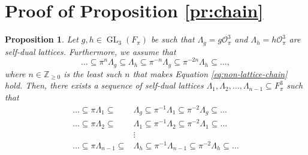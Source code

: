 \documentclass{eptcs}
\newtheorem{proposition}[theorem]{Proposition}
\theoremstyle{remark}
\theoremstyle{definition}
\DeclareMathOperator{\GL}{GL}
\begin{document}
\section{Proof of Proposition \ref{pr:chain}}
\label{proofofprop5.22}
\begin{proposition}
\label{pr:chain_repeat}
    Let $g,h \in \GL_{3}(F_{\pi})$ be such that $\Lambda_{g} = g \mathcal{O}_{\pi}^{3}$ and $\Lambda_{h} =h \mathcal{O}_{\pi}^{3}$ are self-dual lattices. Furthermore, we assume that 
    \begin{equation}
	\dots \subseteq \pi^{n}\Lambda_{g} \subseteq \Lambda_{h} \subseteq \pi^{-n}\Lambda_{g} \subseteq  \pi^{-2n} \Lambda_{h} \subseteq \dots,
	\label{eq:non-lattice-chain-repeat}
    \end{equation}
    where $n \in \mathbb{Z}_{\geq 0}$ is the least such $n$ that makes Equation \ref{eq:non-lattice-chain} hold.
    Then, there exists a sequence of self-dual lattices $\Lambda_{1}, \Lambda_{2} ,\dots, \Lambda_{n-1} \subseteq F_{\pi}^{3}$ such that 
    \begin{align}
	\label{eq:non-lattice-chain2-repeat}
	\dots \subseteq \pi \Lambda_{1} \subseteq &  \Lambda_{g} \subseteq  \pi^{-1} \Lambda_{1} \subseteq \pi^{-2}\Lambda_{g} \subseteq \dots \\
	 \dots \subseteq \pi \Lambda_{2} \subseteq &  \Lambda_{1} \subseteq  \pi^{-1} \Lambda_{2} \subseteq \pi^{-2}\Lambda_{1} \subseteq \dots \\
						   & \vdots \\
	 \dots \subseteq \pi \Lambda_{n-1} \subseteq &  \Lambda_{h} \subseteq  \pi^{-1} \Lambda_{n-1} \subseteq \pi^{-2}\Lambda_{h} \subseteq \dots \\
    \end{align}
\end{proposition}
\end{document}
